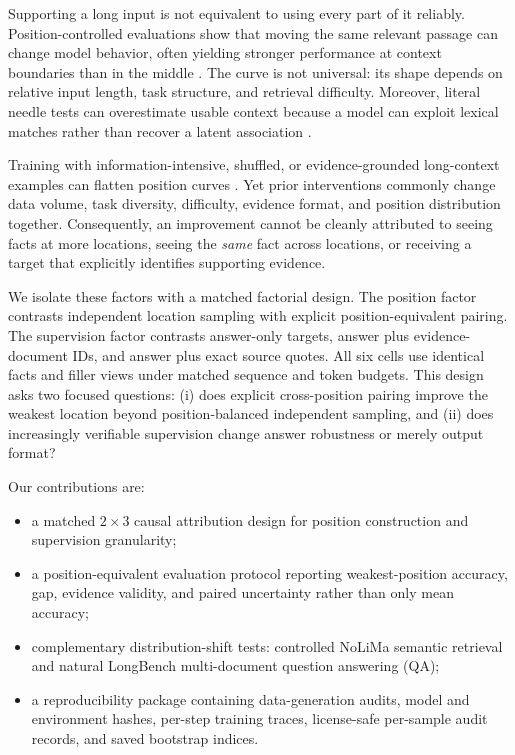 \documentclass[11pt]{article}
\begin{document}
Supporting a long input is not equivalent to using every part of it reliably. Position-controlled evaluations show that moving the same relevant passage can change model behavior, often yielding stronger performance at context boundaries than in the middle \citep{liu2024lost}. The curve is not universal: its shape depends on relative input length, task structure, and retrieval difficulty. Moreover, literal needle tests can overestimate usable context because a model can exploit lexical matches rather than recover a latent association \citep{modarressi2025nolima}.

Training with information-intensive, shuffled, or evidence-grounded long-context examples can flatten position curves \citep{an2024film,he2024never,yuan2026longcrafter}. Yet prior interventions commonly change data volume, task diversity, difficulty, evidence format, and position distribution together. Consequently, an improvement cannot be cleanly attributed to seeing facts at more locations, seeing the \emph{same} fact across locations, or receiving a target that explicitly identifies supporting evidence.

We isolate these factors with a matched factorial design. The position factor contrasts independent location sampling with explicit position-equivalent pairing. The supervision factor contrasts answer-only targets, answer plus evidence-document IDs, and answer plus exact source quotes. All six cells use identical facts and filler views under matched sequence and token budgets. This design asks two focused questions: (i) does explicit cross-position pairing improve the weakest location beyond position-balanced independent sampling, and (ii) does increasingly verifiable supervision change answer robustness or merely output format?

Our contributions are:
\begin{itemize}
    \item a matched $2\times3$ causal attribution design for position construction and supervision granularity;
    \item a position-equivalent evaluation protocol reporting weakest-position accuracy, gap, evidence validity, and paired uncertainty rather than only mean accuracy;
    \item complementary distribution-shift tests: controlled NoLiMa semantic retrieval and natural LongBench multi-document question answering (QA);
    \item a reproducibility package containing data-generation audits, model and environment hashes, per-step training traces, license-safe per-sample audit records, and saved bootstrap indices.
\end{itemize}
\end{document}
